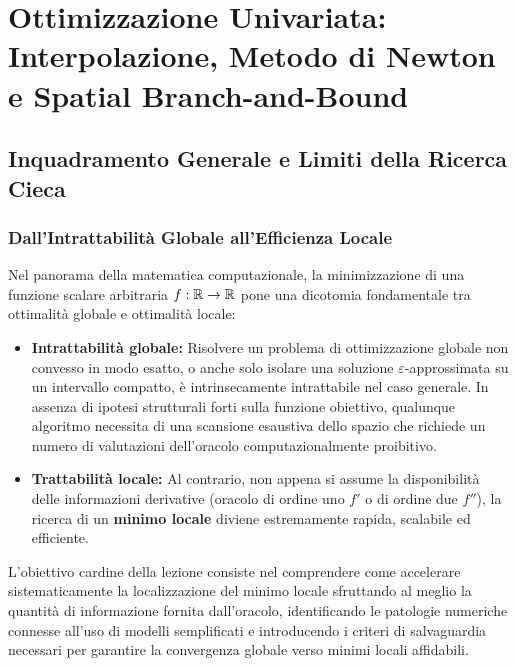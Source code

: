 \chapter[Ottimizzazione Univariata: Interpolazione, Metodo di Newton e Branch-and-Bound]{Ottimizzazione Univariata:\\Interpolazione, Metodo di Newton e Spatial Branch-and-Bound}
\label{chap:ottimizzazione-univariata-modelli-newton-branch-and-bound}

\FloatBarrier
\section{Inquadramento Generale e Limiti della Ricerca Cieca}
\label{sec:univariata-inquadramento-cieca}

\subsection{Dall'Intrattabilit\`a Globale all'Efficienza Locale}
Nel panorama della matematica computazionale, la minimizzazione di una funzione scalare arbitraria $f: \mathbb{R} \to \mathbb{R}$ pone una dicotomia fondamentale tra ottimalit\`a globale e ottimalit\`a locale:
\begin{itemize}
    \item \textbf{Intrattabilit\`a globale:} Risolvere un problema di ottimizzazione globale non convesso in modo esatto, o anche solo isolare una soluzione $\varepsilon$-approssimata su un intervallo compatto, \`e intrinsecamente intrattabile nel caso generale. In assenza di ipotesi strutturali forti sulla funzione obiettivo, qualunque algoritmo necessita di una scansione esaustiva dello spazio che richiede un numero di valutazioni dell'oracolo computazionalmente proibitivo.
    \item \textbf{Trattabilit\`a locale:} Al contrario, non appena si assume la disponibilit\`a delle informazioni derivative (oracolo di ordine uno $f'$ o di ordine due $f''$), la ricerca di un \textbf{minimo locale} diviene estremamente rapida, scalabile ed efficiente.
\end{itemize}

L'obiettivo cardine della lezione consiste nel comprendere come accelerare sistematicamente la localizzazione del minimo locale sfruttando al meglio la quantit\`a di informazione fornita dall'oracolo, identificando le patologie numeriche connesse all'uso di modelli semplificati e introducendo i criteri di salvaguardia necessari per garantire la convergenza globale verso minimi locali affidabili.

